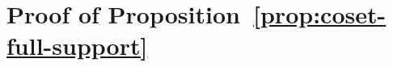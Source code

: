 \documentclass[journal,draftcls,onecolumn]{IEEEtran}
\theoremstyle{mystyle}
\newcommand{\bfB}{\mathbf{B}}
\newcommand{\cF}{\mathcal{F}}
\begin{document}














\section{Proof of Proposition~\ref{prop:coset-full-support}}
\label{app:coset-full-support}
\end{document}
